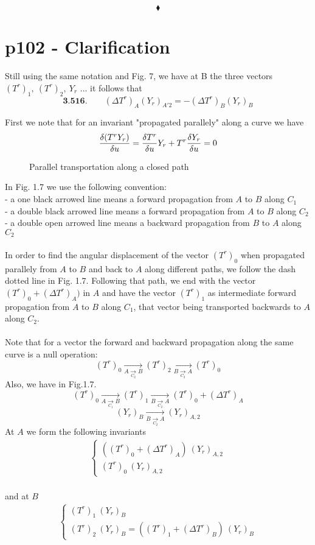 $$\blacklozenge$$
\newpage


\section{p102 - Clarification}
\begin{tcolorbox}
Still using the same notation and Fig. 7, we have at B the three vectors $(T^r)_1,\ (T^r)_2,\ Y_r$ ...  it follows that $$\textbf{3.516.}\quad \quad (\Delta T^r)_A(Y_r)_{A'2}= - (\Delta T^r)_B(Y_r)_B$$
\end{tcolorbox}
First we note that for an invariant "propagated parallely" along a curve we have $$\fdv{(T^r Y_r)}{u} = \fdv{T^r} {u}Y_r+T^r\fdv{Y_r}{u}=0$$
\begin{figure}[h]

\caption{Parallel transportation along a  closed path}
\end{figure}
In Fig. 1.7 we use the following convention:\\
- a one black arrowed line means a forward propagation from $A$ to $B$ along $C_1$\\
- a double black arrowed line means a forward propagation from $A$ to $B$ along $C_2$\\
- a double open arrowed line means a backward propagation from $B$ to $A$ along $C_2$\\\\
In order to find the angular displacement of the vector $(T^r)_0$ when propagated parallely from $A$ to $B$ and back to $A$ along different paths, we follow  the dash dotted line in Fig. 1.7. Following that path, we end with the vector $(T^r)_0+ (\Delta T^r)_{A})$ in $A$ and have the vector $(T^r)_1$ as intermediate forward propagation from $A$ to $B$ along $C_1$, that vector being transported backwards to $A$ along $C_2$.\\\\
Note that for a vector the forward and backward propagation along the same curve is a null operation:$$(T^r)_0 \underset{\underset{C_2}{A\rightarrow B}}{\rightarrow} (T^r)_2 \underset{\underset{C_2}{B\rightarrow A}}{\rightarrow} (T^r)_0$$
Also, we have in Fig.1.7.
$$(T^r)_0 \underset{\underset{C_1}{A\rightarrow B}}{\rightarrow} (T^r)_1 \underset{\underset{C_2}{B\rightarrow A}}{\rightarrow} (T^r)_0+ (\Delta T^r)_{A}$$
$$(Y_r)_{B} \underset{\underset{C_2}{B\rightarrow A}}{\rightarrow} (Y_r)_{A,2}$$
At $A$ we form the following invariants
\begin{align}
\left \{ \begin{array}{l}
 ((T^r)_0+ (\Delta T^r)_{A})\ (Y_r)_{A,2}\\
 (T^r)_0 \ (Y_r)_{A,2}
\end{array} \right.
\end{align}\\
and at $B$
\begin{align}
\left \{ \begin{array}{l}
 (T^r)_1\ (Y_r)_{B}\\
 (T^r)_2 \ (Y_r)_{B} = ((T^r)_1+(\Delta T^r)_B )\ (Y_r)_{B}
\end{array} \right.
\end{align}\\

